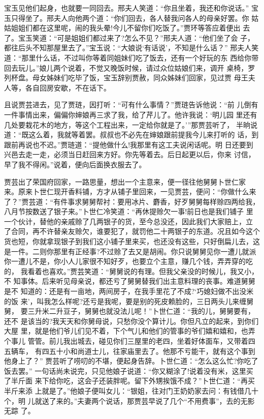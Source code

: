 宝玉见他们起身，也就要一同回去。邢夫人笑道：“你且坐着，我还和你说话。”
宝玉只得坐了。邢夫人向他两个道：“你们回去，各人替我问各人的母亲好罢。你
姑姑姐姐们都在这里呢，闹的我头晕!今儿不留你们吃饭了。”贾环等答应着便出
去了。宝玉笑道：“可是姐姐们都过来了?怎么不见？”邢夫人道：“他们坐了会
子，都往后头不知那屋里去了。”宝玉说：“大娘说‘有话说’，不知是什么话？”
邢夫人笑道：“那里什么话，不过叫你等着同姐妹们吃了饭去，还有一个好玩的东
西给你带回去玩儿。”娘儿两个说着，不觉又晚饭时候，请过众位姑娘们来，调开
桌椅，罗列杯盘。母女姊妹们吃毕了饭，宝玉辞别贾赦，同众姊妹们回家，见过贾
母王夫人等，各自回房安歇，不在话下。

且说贾芸进去，见了贾琏，因打听：“可有什么事情？”贾琏告诉他说：“前
儿倒有一件事情出来，偏偏你婶娘再三求了我，给了芹儿了。他许我说：‘明儿园
里还有几处要栽花木的地方，等这个工程出来，一定给你就是了。’”那贾芸听了，
半晌说道：“既这么着，我就等着罢。叔叔也不必先在婶娘跟前提我今儿来打听的
话，到跟前再说也不迟。”贾琏道：“提他做什么!我那里有这工夫说闲话呢。明
日还要到兴邑去走一走，必须当日赶回来方好。你先等着去。后日起更以后，你来
讨信，早了我不得闲。”说着，便向后面换衣服去了。

贾芸出了荣国府回家，一路思量，想出一个主意来，便一径往他舅舅卜世仁家
来。原来卜世仁现开香料铺，方才从铺子里回来，一见贾芸，便问：“你做什么来
了？”贾芸道：“有件事求舅舅帮衬：要用冰片、麝香，好歹舅舅每样赊四两给我，
八月节按数送了银子来。”卜世仁冷笑道：“再休提赊欠一事!前日也是我们铺子
里一个伙计，替他的亲戚赊了几两银子的货，至今总没还，因此我们大家赔上，立
了合同，再不许替亲友赊欠，谁要犯了，就罚他二十两银子的东道。况且如今这个
货也短，你就拿现银子到我们这小铺子里来买，也还没有这些，只好倒扁儿去，这
是一件。二则你那里有正经事?不过赊了去又是胡闹。你只说舅舅见你一遭儿就派
你一遭儿不是，你小人儿家很不知好歹，也要立个主意，赚几个钱，弄弄穿的吃的，
我看着也喜欢。”贾芸笑道：“舅舅说的有理。但我父亲没的时候儿，我又小，不
知事体。后来听见母亲说，都还亏了舅舅替我们出主意料理的丧事。难道舅舅是不
知道的：还是有一亩地，两间房子，在我手里花了不成?‘巧媳妇做不出没米的饭
来’，叫我怎么样呢?还亏是我呢，要是别的死皮赖脸的，三日两头儿来缠舅舅，
要三升米二升豆子，舅舅也就没法儿呢！”卜世仁道：“我的儿，舅舅要有，还不
是该当的?我天天和你舅母说，只愁你没个算计儿。你但凡立的起来，到你们大屋
里，就是他们爷儿们见不着，下个气儿和他们的管事的爷们嬉和嬉和，也弄个事儿
管管。前儿我出城去，碰见你们三屋里的老四，坐着好体面车，又带着四五辆车，
有四五十小和尚道士儿，往家庙里去了。他那不亏能干，就有这个事到他身上了？”
贾芸听了唠叨的不堪，便起身告辞。卜世仁道：“怎么这么忙?你吃了饭去罢。”
一句话尚未说完，只见他娘子说道：“你又糊涂了!说着没有米，这里买了半斤面
来下给你吃，这会子还装胖呢。留下外甥挨饿不成？”卜世仁道：“再买半斤来添
上就是了。”他娘子便叫女儿：“银姐，往对门王奶奶家去问：有钱借几十个，明
儿就送了来的。”夫妻两个说话，那贾芸早说了几个“不用费事”，去的无影无踪
了。


